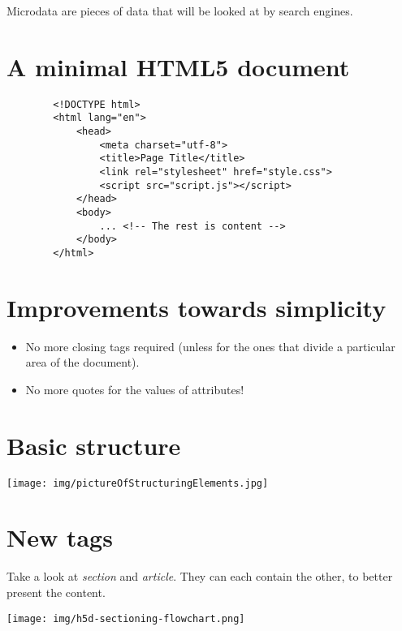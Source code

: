 \documentclass[a4paper,11pt]{book}
\begin{document}
    Microdata are pieces of data that will be looked at by search engines.
    
    \section{A minimal HTML5 document}
    \begin{verbatim}
        <!DOCTYPE html>
        <html lang="en">
            <head>
                <meta charset="utf-8">
                <title>Page Title</title>
                <link rel="stylesheet" href="style.css">
                <script src="script.js"></script>
            </head>
            <body>
                ... <!-- The rest is content -->
            </body>
        </html>
    \end{verbatim}

    \section{Improvements towards simplicity}
    \begin{itemize}
    \item No more closing tags required (unless for the ones that divide a particular area
    of the document).
    \item No more quotes for the values of attributes!
    \end{itemize}

    \section{Basic structure}
    \texttt{[image: img/pictureOfStructuringElements.jpg]}

    \section{New tags}
    Take a look at \emph{section} and \emph{article}. They can each contain the other, to better present
    the content.

    \texttt{[image: img/h5d-sectioning-flowchart.png]}
\end{document}
